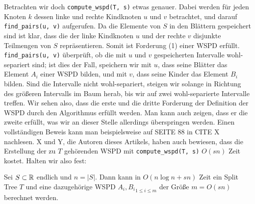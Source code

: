 	Betrachten wir doch \texttt{compute\_wspd(T, s)} etwas genauer. Dabei werden für jeden Knoten $k$ dessen linke und rechte Kindknoten $u$ und $v$ betrachtet, und darauf \texttt{find\_pairs(u, v)} aufgerufen. Da die Elemente von $S$ in den Blättern gespeichert sind ist klar, dass die der linke Kindknoten $u$ und der rechte $v$ disjunkte Teilmengen von $S$ repräsentieren. Somit ist Forderung (1) einer WSPD erfüllt. \texttt{find\_pairs(u, v)} überprüft, ob die mit $u$ und $v$ gespeicherten Intervalle wohl-separiert sind; ist dies der Fall, speichern wir mit $u$, dass seine Blätter das Element $A_i$ einer WSPD bilden, und mit $v$, dass seine Kinder das Element $B_i$ bilden. Sind die Intervalle nicht wohl-separiert, steigen wir solange in Richtung des größeren Intervalls im Baum herab, bis wir auf zwei wohl-separierte Intervalle treffen. Wir sehen also, dass die erste und die dritte Forderung der Definition der WSPD durch den Algorithmus erfüllt werden. Man kann auch zeigen, dass er die zweite erfüllt, was wir an dieser Stelle allerdings überspringen werden. Einen vollständigen Beweis kann man beispielsweise auf SEITE 88 in CITE X nachlesen. X und Y, die Autoren dieses Artikels, haben auch bewiesen, dass die Erstellung der zu $T$ gehörenden WSPD mit \texttt{compute\_wspd(T, s)} $O(sn)$ Zeit kostet. Halten wir also fest:
	\begin{theorem}
		\label{theo:wspdtime}
		Sei $S \subset \mathbb{R}$ endlich und $n = |S|$. Dann kann in $O(n \log n + sn)$ Zeit ein Split Tree $T$ und eine dazugehörige WSPD ${A_i, B_i}_{1 \leq i \leq m}$ der Größe $m = O(sn)$ berechnet werden.
	\end{theorem}